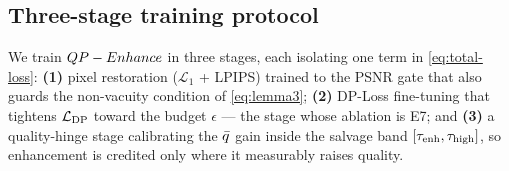 \subsection{Three-stage training protocol}\label{sec:training}
We train $QP-Enhance$ in three stages, each isolating one term in \eqref{eq:total-loss}: \textbf{(1)}
pixel restoration ($\mathcal{L}_1$ + LPIPS) trained to the PSNR gate that also guards the non-vacuity
condition of \eqref{eq:lemma3}; \textbf{(2)} DP-Loss fine-tuning that tightens $\mathcal{L}_{\mathrm{DP}}$ toward the budget
$\epsilon$ --- the stage whose ablation is E7; and \textbf{(3)} a quality-hinge stage calibrating the
$\bar{q}$ gain inside the salvage band $[\tau_{\mathrm{enh}},\tau_{\mathrm{high}}]$, so enhancement is credited only where it
measurably raises quality.
